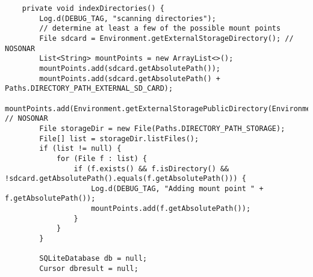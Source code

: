\begin{enumerate}
    \begin{verbatim}
    private void indexDirectories() {
        Log.d(DEBUG_TAG, "scanning directories");
        // determine at least a few of the possible mount points
        File sdcard = Environment.getExternalStorageDirectory(); // NOSONAR
        List<String> mountPoints = new ArrayList<>();
        mountPoints.add(sdcard.getAbsolutePath());
        mountPoints.add(sdcard.getAbsolutePath() + Paths.DIRECTORY_PATH_EXTERNAL_SD_CARD);
        mountPoints.add(Environment.getExternalStoragePublicDirectory(Environment.DIRECTORY_DOWNLOADS).getAbsolutePath()); // NOSONAR
        File storageDir = new File(Paths.DIRECTORY_PATH_STORAGE);
        File[] list = storageDir.listFiles();
        if (list != null) {
            for (File f : list) {
                if (f.exists() && f.isDirectory() && !sdcard.getAbsolutePath().equals(f.getAbsolutePath())) {
                    Log.d(DEBUG_TAG, "Adding mount point " + f.getAbsolutePath());
                    mountPoints.add(f.getAbsolutePath());
                }
            }
        }

        SQLiteDatabase db = null;
        Cursor dbresult = null;


\end{verbatim}
\end{enumerate}

